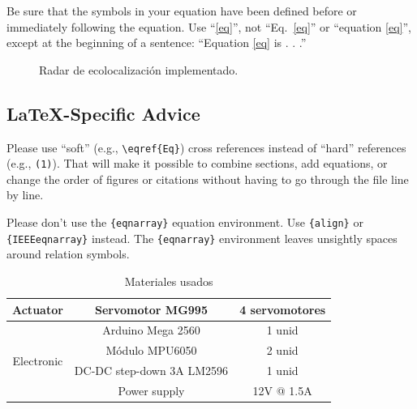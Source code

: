 \documentclass[conference]{IEEEtran}
\begin{document}
Be sure that the 
symbols in your equation have been defined before or immediately following 
the equation. Use ``\eqref{eq}'', not ``Eq.~\eqref{eq}'' or ``equation \eqref{eq}'', except at 
the beginning of a sentence: ``Equation \eqref{eq} is . . .''

\begin{figure}[h]
 \centering
    \hfill
 \caption{Radar de ecolocalización implementado.}
 \label{fig2}
\end{figure}

\subsection{\LaTeX-Specific Advice}

Please use ``soft'' (e.g., \verb|\eqref{Eq}|) cross references instead
of ``hard'' references (e.g., \verb|(1)|). That will make it possible
to combine sections, add equations, or change the order of figures or
citations without having to go through the file line by line.

Please don't use the \verb|{eqnarray}| equation environment. Use
\verb|{align}| or \verb|{IEEEeqnarray}| instead. The \verb|{eqnarray}|
environment leaves unsightly spaces around relation symbols.

\begin{table}[h]
\centering
\caption{Materiales usados}
\label{tabla:Characteristics-final}
\begin{tabular}{|c|c|c|}
\hline
Actuator                    & Servomotor MG995          & 4 servomotores \\ \hline
\multirow{4}{*}{Electronic} & Arduino Mega 2560         & 1 unid         \\ \cline{2-3} 
                            & Módulo MPU6050            & 2 unid         \\ \cline{2-3} 
                            & DC-DC step-down 3A LM2596 & 1 unid         \\ \cline{2-3} 
                            & Power supply              & 12V @ 1.5A     \\ \hline
\end{tabular}
\end{table}
\end{document}

